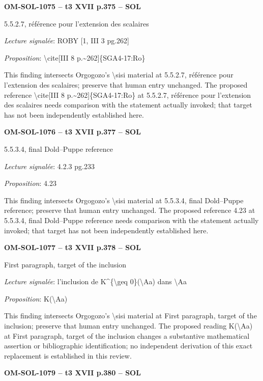 \par\noindent\textbf{OM-SOL-1075 -- t3 XVII p.375 -- SOL}\par
5.5.2.7, référence pour l'extension des scalaires\par
\emph{Lecture signalée}: ROBY [1, III 3 pg.262]\par
\emph{Proposition}: \textbackslash{}cite[III 8 p.\textasciitilde{}262]\{SGA4-17:Ro\}\par
This finding intersects Orgogozo's \textbackslash{}sisi material at 5.5.2.7, référence pour l'extension des scalaires; preserve that human entry unchanged. The proposed reference \textbackslash{}cite[III 8 p.\textasciitilde{}262]\{SGA4-17:Ro\} at 5.5.2.7, référence pour l'extension des scalaires needs comparison with the statement actually invoked; that target has not been independently established here.\par
\par\noindent\textbf{OM-SOL-1076 -- t3 XVII p.377 -- SOL}\par
5.5.3.4, final Dold–Puppe reference\par
\emph{Lecture signalée}: 4.2.3 pg.233\par
\emph{Proposition}: 4.23\par
This finding intersects Orgogozo's \textbackslash{}sisi material at 5.5.3.4, final Dold–Puppe reference; preserve that human entry unchanged. The proposed reference 4.23 at 5.5.3.4, final Dold–Puppe reference needs comparison with the statement actually invoked; that target has not been independently established here.\par
\par\noindent\textbf{OM-SOL-1077 -- t3 XVII p.378 -- SOL}\par
First paragraph, target of the inclusion\par
\emph{Lecture signalée}: l'inclusion de K\textasciicircum{}\{\textbackslash{}geq 0\}(\textbackslash{}Aa) dans \textbackslash{}Aa\par
\emph{Proposition}: K(\textbackslash{}Aa)\par
This finding intersects Orgogozo's \textbackslash{}sisi material at First paragraph, target of the inclusion; preserve that human entry unchanged. The proposed reading K(\textbackslash{}Aa) at First paragraph, target of the inclusion changes a substantive mathematical assertion or bibliographic identification; no independent derivation of this exact replacement is established in this review.\par
\par\noindent\textbf{OM-SOL-1079 -- t3 XVII p.380 -- SOL}\par
